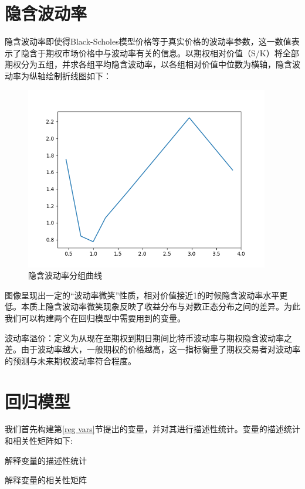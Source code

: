 \section{隐含波动率}
隐含波动率即使得Black-Scholes模型价格等于真实价格的波动率参数，这一数值表示了隐含于期权市场价格中与波动率有关的信息。以期权相对价值（S/K）将全部期权分为五组，并求各组平均隐含波动率，以各组相对价值中位数为横轴，隐含波动率为纵轴绘制折线图如下：
\begin{figure}[H]
    \begin{small}
        \begin{center}
            \includegraphics[width=0.95\textwidth]{figures/mean_isd.png}
        \end{center}
        \caption{隐含波动率分组曲线}
        \label{fig:mean_isd}
    \end{small}
\end{figure}
图像呈现出一定的“波动率微笑”性质，相对价值接近1的时候隐含波动率水平更低。本质上隐含波动率微笑现象反映了收益分布与对数正态分布之间的差异。为此我们可以构建两个在回归模型中需要用到的变量。
\par{
    波动率溢价：定义为从现在至期权到期日期间比特币波动率与期权隐含波动率之差。由于波动率越大，一般期权的价格越高，这一指标衡量了期权交易者对波动率的预测与未来期权波动率符合程度。
}

\section{回归模型}
我们首先构建第\ref{reg vars}节提出的变量，并对其进行描述性统计。变量的描述统计和相关性矩阵如下:
\newpage
{}
\begin{landscape} 
    \begin{table}[H]
        \caption{解释变量的描述性统计}
        \resizebox{\linewidth}{!}{
        
        }
    \end{table}
    \begin{table}[H]
        \caption{解释变量的相关性矩阵}
        \resizebox{\linewidth}{!}{    }
    \end{table}    
\end{landscape}

